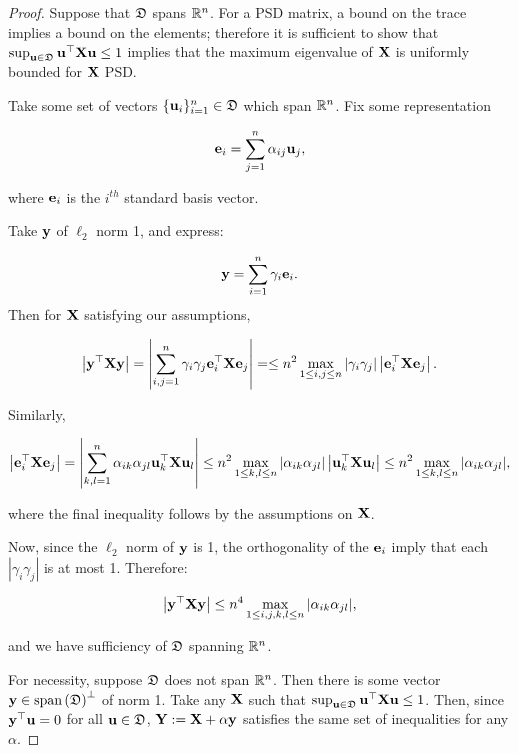 \begin{proof}
Suppose that $\mathfrak{D}$ spans $\mathbb{R}^n$. For a PSD matrix, a bound on the trace implies a bound on the elements; therefore it is sufficient to show that $\sup_{\mathbf{u} \in \mathfrak{D}} \mathbf{u}^\top\mathbf{X}\mathbf{u} \leq 1$ implies that the maximum eigenvalue of $\mathbf{X}$ is uniformly bounded for $\mathbf{X}$ PSD.

Take some set of vectors $\{\mathbf{u}_i\}_{i=1}^{n} \in \mathfrak{D}$ which span $\mathbb{R}^{n}$. Fix some representation

$$
\mathbf{e}_i = \sum_{j=1}^{n} \alpha_{ij} \mathbf{u}_j,
$$

where $\mathbf{e}_i$ is the $i^{th}$ standard basis vector.

Take $\mathbf{y}$ of $\ell_2$ norm 1, and express:

$$\mathbf{y} = \sum_{i=1}^n \gamma_i \mathbf{e}_i.$$
Then for $\mathbf{X}$ satisfying our assumptions,

\begin{equation}
    \left|\mathbf{y}^\top\mathbf{X}\mathbf{y}\right| = \left|\sum_{i,j=1}^n \gamma_i\gamma_j \mathbf{e}_i^\top\mathbf{X}\mathbf{e}_j \right|= \leq n^2 \max_{1 \leq i, j \leq n} |\gamma_i\gamma_j| \left|\mathbf{e}_i^\top\mathbf{X}\mathbf{e}_j \right|.
\end{equation}

Similarly, 

\begin{equation}
    \left|\mathbf{e}_i^\top\mathbf{X}\mathbf{e}_j \right| = \left|\sum_{k, l=1}^{n} \alpha_{ik}\alpha_{jl} \mathbf{u}_k^\top\mathbf{X}\mathbf{u}_l\right| \leq  n^2 \max_{1 \leq k, l \leq n} |\alpha_{ik}\alpha_{jl}| \left|\mathbf{u}_k^\top\mathbf{X}\mathbf{u}_l
    \right| \leq  n^2 \max_{1 \leq k, l \leq n} |\alpha_{ik}\alpha_{jl}|,
\end{equation}

where the final inequality follows by the assumptions on $\mathbf{X}$.

Now, since the $\ell_2$ norm of $\mathbf{y}$ is 1, the orthogonality of the $\mathbf{e}_i$ imply that each $|\gamma_i\gamma_j|$ is at most 1. Therefore:

\begin{equation}
\left|\mathbf{y}^\top\mathbf{X}\mathbf{y}\right| \leq n^4 \max_{1 \leq i, j, k, l \leq n} |\alpha_{ik}\alpha_{jl}|,
\end{equation}

and we have sufficiency of $\mathfrak{D}$ spanning $\mathbb{R}^n$.

For necessity, suppose $\mathfrak{D}$ does not span $\mathbb{R}^n$. Then there is some vector $\mathbf{y} \in \text{span}\left(\mathfrak{D}\right)^\perp$ of norm 1. Take any $\mathbf{X}$ such that $\sup_{\mathbf{u} \in \mathfrak{D}} \mathbf{u}^\top\mathbf{X}\mathbf{u} \leq 1$. Then, since $\mathbf{y}^\top\mathbf{u} = 0$ for all $\mathbf{u} \in \mathfrak{D}$, $\mathbf{Y} := \mathbf{X} + \alpha \mathbf{y}$ satisfies the same set of inequalities for any $\alpha$.
\end{proof}

